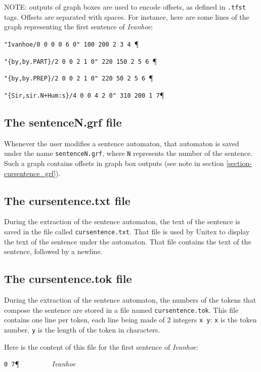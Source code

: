 \bigskip
\noindent NOTE: outputs of graph boxes are used to encode offsets, as defined 
in \verb+.tfst+ tags. Offsets are separated with spaces. For instance, here are
some lines of the graph representing the first sentence of \textit{Ivanhoe}:

\bigskip
\noindent \verb$"Ivanhoe/0 0 0 0 6 0" 100 200 2 3 4 $\P
 
\noindent \verb$"{by,by.PART}/2 0 0 2 1 0" 220 150 2 5 6 $\P

\noindent \verb$"{by,by.PREP}/2 0 0 2 1 0" 220 50 2 5 6 $\P

\noindent \verb$"{Sir,sir.N+Hum:s}/4 0 0 4 2 0" 310 200 1 7$\P 




\subsection{The sentenceN.grf file}
Whenever the user modifies a sentence automaton, that automaton is saved under
the name \verb+sentenceN.grf+, where \verb+N+ represents the number of the
sentence. Such a graph contains offsets in graph box outputs (see note in
section \ref{section-cursentence_grf}).


\subsection{The cursentence.txt file}
During the extraction of the sentence automaton, the text of the sentence is
saved in the file called \verb+cursentence.txt+. That file is used by Unitex to
display the text of the sentence under the automaton. That file contains the text
of the sentence, followed by a newline.

\subsection{The cursentence.tok file}
During the extraction of the sentence automaton, the numbers of the tokens that
compose the sentence are stored in a file named \verb+cursentence.tok+. This
file contains one line per token, each line being made of 2 integers \verb$x y$:
\verb$x$ is the token number, \verb$y$ is the length of the token in characters.

\bigskip
\noindent Here is the content of this file for the first sentence of
\textit{Ivanhoe}:

\bigskip
\noindent \verb$0 7$\P \verb$         $\textit{Ivanhoe}


